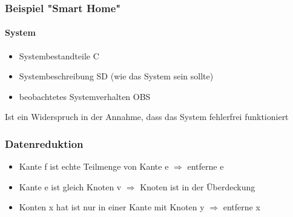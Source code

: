 \documentclass[ngerman]{scrartcl}
\begin{document}
\subsubsection{Beispiel "Smart Home"}
\paragraph{System}
\begin{itemize}
  \item Systembestandteile C
  \item Systembeschreibung SD (wie das System sein sollte)
  \item beobachtetes Systemverhalten OBS
\end{itemize}
Ist ein Widerspruch in der Annahme, dass das System fehlerfrei funktioniert 

\subsubsection{Datenreduktion}
\begin{itemize}
  \item Kante f ist echte Teilmenge von Kante e $ \Rightarrow $ entferne e
  \item Kante e ist gleich Knoten v $ \Rightarrow $ Knoten ist in der Überdeckung
  \item Konten x hat ist nur in einer Kante mit Knoten y $ \Rightarrow $ entferne x
\end{itemize}
\end{document}
